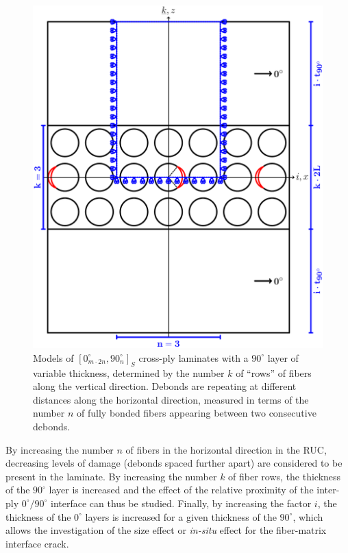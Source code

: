 \documentclass[review]{elsarticle}
\begin{document}
\begin{figure}[!h]
\centering
        \includegraphics[width=\textwidth]{ThickPly.pdf}
\caption{Models of $\left[0_{m\cdot2n}^{\circ},90_{n}^{\circ}\right]_{S}$ cross-ply laminates with a $90^{\circ}$ layer of variable thickness, determined by the number $k$ of ``rows'' of fibers along the vertical direction.  Debonds are repeating at different distances along the horizontal direction, measured in terms of the number $n$ of fully bonded fibers appearing between two consecutive debonds.}\label{fig:laminateModelsB}
\end{figure}

By increasing the number $n$ of fibers in the horizontal direction in the RUC, decreasing levels of damage (debonds spaced further apart) are considered to be present in the laminate. By increasing the number $k$ of fiber rows, the thickness of the $90^{\circ}$ layer is increased and the effect of the relative proximity of the inter-ply $0^{\circ}/90^{\circ}$ interface can thus be studied. Finally, by increasing the factor $i$, the thickness of the $0^{\circ}$ layers is increased for a given thickness of the $90^{\circ}$, which allows the investigation of the size effect or \emph{in-situ} effect for the fiber-matrix interface crack.
\end{document}
